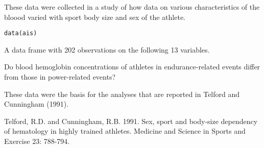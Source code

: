 \begin{Description}\relax
These data were collected in a study of how 
data on various characteristics of the bloood varied with sport
body size and sex of the athlete.
\end{Description}
\begin{Usage}
\begin{verbatim}data(ais)\end{verbatim}
\end{Usage}
\begin{Format}\relax
A data frame with 202 observations on the following 13 variables.
\end{Format}
\begin{Details}\relax
Do blood hemoglobin concentrations of athletes in endurance-related
events differ from those in power-related events?
\end{Details}
\begin{Source}\relax
These data were the basis for the analyses that are reported in
Telford and Cunningham (1991).
\end{Source}
\begin{References}\relax
Telford, R.D. and Cunningham, R.B. 1991.  Sex, sport and
body-size dependency of hematology in highly trained athletes.
Medicine and Science in Sports and Exercise 23: 788-794.
\end{References}

